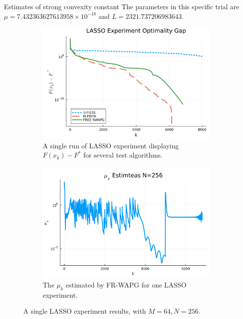 \documentclass[11pt]{beamer}
\theoremstyle{definition}
\begin{document}
        \begin{frame}{Estimates of strong convexity constant}
            The parameters in this specific trial are $\mu = 7.432363627613958\times 10^{-18}$ and $L = 2321.737206983643$. 
            \begin{figure}[H]
                \begin{subfigure}[b]{0.47\textwidth}
                    \includegraphics[width=\textwidth]{assets/lasso_loss_256.png}
                    \caption
                    {A single run of LASSO experiment displaying $F(x_k) - F^*$ for several test algorithms.
                    }
                \end{subfigure}
                \begin{subfigure}[b]{0.47\textwidth}
                    \includegraphics[width=\textwidth]{assets/lasso_sc_estimates_256.png}
                    \caption{The $\mu_k$ estimated by FR-WAPG for one LASSO experiment. }
                \end{subfigure}
                \caption{A single LASSO experiment results, with $M = 64, N=256$.}
                \label{fig:single-lass-mu-estimates}
            \end{figure}
        \end{frame}
\end{document}
